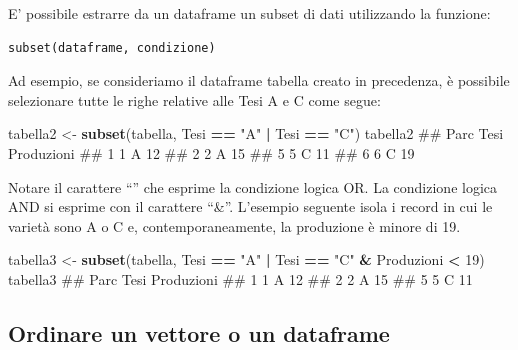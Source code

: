 \documentclass[a4paper,12pt,oneside]{book}
\newenvironment{Shaded}{\begin{snugshade}}{\end{snugshade}}
\newcommand{\KeywordTok}[1]{\textcolor[rgb]{0.13,0.29,0.53}{\textbf{#1}}}
\newcommand{\DecValTok}[1]{\textcolor[rgb]{0.00,0.00,0.81}{#1}}
\newcommand{\StringTok}[1]{\textcolor[rgb]{0.31,0.60,0.02}{#1}}
\newcommand{\OperatorTok}[1]{\textcolor[rgb]{0.81,0.36,0.00}{\textbf{#1}}}
\newcommand{\NormalTok}[1]{#1}
\theoremstyle{definition}
\theoremstyle{definition}
\theoremstyle{definition}
\theoremstyle{remark}
\begin{document}
E' possibile estrarre da un dataframe un subset di dati utilizzando la
funzione:

\begin{verbatim}
subset(dataframe, condizione)
\end{verbatim}

Ad esempio, se consideriamo il dataframe tabella creato in precedenza, è
possibile selezionare tutte le righe relative alle Tesi A e C come
segue:

\begin{Shaded}
\begin{Highlighting}[]
\NormalTok{tabella2  <-}\StringTok{  }\KeywordTok{subset}\NormalTok{(tabella, Tesi }\OperatorTok{==}\StringTok{ "A"} \OperatorTok{|}\StringTok{ }\NormalTok{Tesi }\OperatorTok{==}\StringTok{ "C"}\NormalTok{)}
\NormalTok{tabella2}
\NormalTok{##   Parc Tesi Produzioni}
\NormalTok{## 1    1    A         12}
\NormalTok{## 2    2    A         15}
\NormalTok{## 5    5    C         11}
\NormalTok{## 6    6    C         19}
\end{Highlighting}
\end{Shaded}

Notare il carattere ``\textbar{}'' che esprime la condizione logica OR.
La condizione logica AND si esprime con il carattere ``\&''. L'esempio
seguente isola i record in cui le varietà sono A o C e,
contemporaneamente, la produzione è minore di 19.

\begin{Shaded}
\begin{Highlighting}[]
\NormalTok{tabella3  <-}\StringTok{  }\KeywordTok{subset}\NormalTok{(tabella, Tesi }\OperatorTok{==}\StringTok{ "A"} \OperatorTok{|}\StringTok{ }\NormalTok{Tesi }\OperatorTok{==}\StringTok{ "C"} \OperatorTok{&}\StringTok{ }
\StringTok{                       }\NormalTok{Produzioni }\OperatorTok{<}\StringTok{ }\DecValTok{19}\NormalTok{)}
\NormalTok{tabella3}
\NormalTok{##   Parc Tesi Produzioni}
\NormalTok{## 1    1    A         12}
\NormalTok{## 2    2    A         15}
\NormalTok{## 5    5    C         11}
\end{Highlighting}
\end{Shaded}

\subsection*{Ordinare un vettore o un
dataframe}\label{ordinare-un-vettore-o-un-dataframe}
\end{document}
